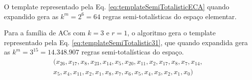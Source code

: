 O template representado pela Eq. \eqref{eq:templateSemiTotalisticECA} quando expandido gera as $k^m = 2^6 = 64$ regras semi-totalísticas do espaço elementar.

Para a família de ACs com $k=3$ e $r=1$, o algoritmo gera o template representado pela Eq. \eqref{eq:templateSemiTotalistic31}, que quando expandida gera as $k^m = 3^{15} = 14.348.907$ regras semi-totalísticas do espaço.
\begin{equation}
\begin{split}
(x_{26},x_{17},x_8,x_{23},x_{14},x_5,x_{20},x_{11},x_2,x_{17},x_8,x_7,x_{14},\\
x_5,x_4,x_{11},x_2,x_1,x_8,x_7,x_6,x_5,x_4,x_3,x_2,x_1,x_0)
\label{eq:templateSemiTotalistic31}
\end{split}
\end{equation}